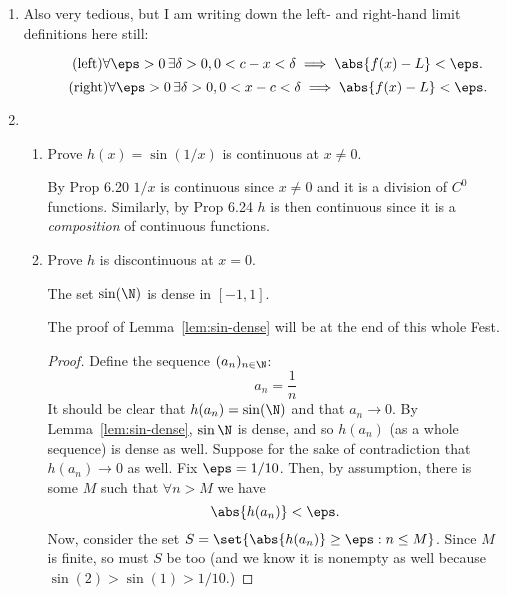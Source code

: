 \documentclass{article}
\begin{document}
\begin{enumerate}
        \begin{proof}
          Suppose there is some $\alpha \notin \Q$ such that $f(\alpha) \ne 0$. Fix $\eps = \abs{f(\alpha)}$.
          For each $\delta > 0$ we see that
          \[ \abs{x - \alpha} < \delta \implies \abs{f(x) - f(\alpha)}. \]
          However, similar to before, we may pick some rational $x$ within $N_{\delta}(\alpha)$, and so find
          that
          \[ \abs{x - \alpha} < \delta \quad\text{and}\quad \abs{f(x) - f(\alpha)} = \abs{f(\alpha)} \not< \eps. \]
        \end{proof}
  \item Also very tedious, but I am writing down the left- and right-hand limit definitions here still:

        \[\tag{left} \forall \eps > 0 \, \exists \delta > 0, 0 < c - x < \delta \implies \abs{f(x) - L} < \eps. \]
        \[\tag{right} \forall \eps > 0 \, \exists \delta > 0, 0 < x - c < \delta \implies \abs{f(x) - L} < \eps. \]



  \item
        \begin{enumerate}

          \item Prove $h(x) = \sin(1/x)$ is continuous at $x \ne 0$.

                By Prop 6.20 $1/x$ is continuous since $x \ne 0$ and it is a division of $C^{0}$ functions.
                Similarly, by Prop 6.24 $h$ is then continuous since it is a \emph{composition} of continuous functions.

          \item Prove $h$ is discontinuous at $x = 0$.

                \begin{lem}\label{lem:sin-dense}
                  The set $\sin(\N)$ is dense in $[-1, 1]$.
                \end{lem}

                The proof of Lemma~\ref{lem:sin-dense} will be at the end of this whole Fest.

                \begin{proof}
                  Define the sequence $(a_{n})_{n \in \N}$:
                  \[ a_{n} = \frac{1}{n} \]
                It should be clear that $h(a_{n}) = \sin(\N)$ and that $a_{n} \to 0$.
                By Lemma~\ref{lem:sin-dense}, $\sin \N$ is dense, and so $h(a_{n})$ (as a whole sequence) is dense as well.
                Suppose for the sake of contradiction that $h(a_{n}) \to 0$ as well.
                Fix $\eps = 1/10$. Then, by assumption, there is some $M$ such that $\forall n > M$ we have
                \[ \abs{h(a_{n})} < \eps. \]
                Now, consider the set $S = \set{ \abs{h(a_{n})} \ge \eps : n \le M }$.
                Since $M$ is finite, so must $S$ be too (and we know it is nonempty as well because $\sin(2) > \sin(1) > 1/10$.)


\end{proof}
\end{enumerate}
\end{enumerate}
\end{document}

